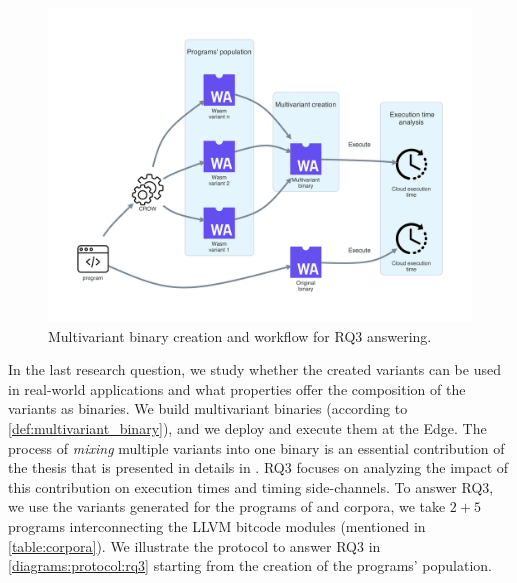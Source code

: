 
\section{\rqthree}
\label{rq3:method}




\newcommand{\mewe}{MEWE\xspace}

\begin{figure}[h]
    \centering
    \includegraphics[width=0.8\linewidth]{diagrams/Rq3.pdf}
    \caption{Multivariant binary creation and workflow for RQ3 answering.}
    \label{diagrams:protocol:rq3}
\end{figure}


In the last research question, we study whether the created variants can be used in real-world applications and what properties offer the composition of the variants as binaries. We build multivariant binaries (according to \autoref{def:multivariant_binary}), and we deploy and execute them at the Edge. The process of \emph{mixing} multiple variants into one binary is an essential contribution of the thesis that is presented in details in \cite{2021arXiv210808125C}. RQ3 focuses on analyzing the impact of this contribution on execution times and timing side-channels. To answer RQ3, we use the variants generated for the programs of \corpussodium and \corpusqrcode corpora, we take $2 + 5$ programs interconnecting the LLVM bitcode modules (mentioned in \autoref{table:corpora}). We illustrate the protocol to answer RQ3 in \autoref{diagrams:protocol:rq3} starting from the creation of the programs' population.



